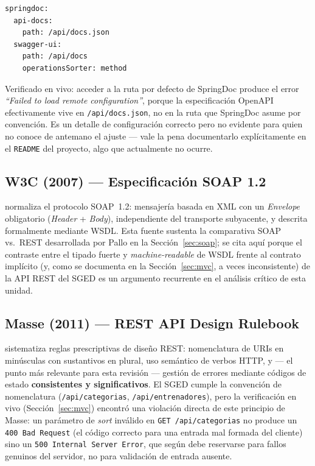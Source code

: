 \documentclass[12pt,a4paper]{article}
\begin{document}
\begin{lstlisting}[style=yaml, caption={Configuración SpringDoc en \texttt{application.yml}}]
springdoc:
  api-docs:
    path: /api/docs.json
  swagger-ui:
    path: /api/docs
    operationsSorter: method
\end{lstlisting}

Verificado en vivo: acceder a la ruta por defecto de SpringDoc produce el error
\textit{``Failed to load remote configuration''}, porque la especificación OpenAPI
efectivamente vive en \texttt{/api/docs.json}, no en la ruta que SpringDoc asume por
convención. Es un detalle de configuración correcto pero no evidente para quien no conoce
de antemano el ajuste --- vale la pena documentarlo explícitamente en el \texttt{README} del
proyecto, algo que actualmente no ocurre.

\subsection{W3C (2007) --- Especificación SOAP 1.2}

\textcite{w3c2007} normaliza el protocolo SOAP~1.2: mensajería basada en XML con un
\textit{Envelope} obligatorio (\textit{Header} + \textit{Body}), independiente del
transporte subyacente, y descrita formalmente mediante WSDL. Esta fuente sustenta la
comparativa SOAP vs.\ REST desarrollada por Pallo en la Sección~\ref{sec:soap}; se cita aquí
porque el contraste entre el tipado fuerte y \textit{machine-readable} de WSDL frente al
contrato implícito (y, como se documenta en la Sección~\ref{sec:mvc}, a veces inconsistente)
de la API REST del SGED es un argumento recurrente en el análisis crítico de esta unidad.

\subsection{Masse (2011) --- REST API Design Rulebook}

\textcite{masse2011} sistematiza reglas prescriptivas de diseño REST: nomenclatura de URIs
en minúsculas con sustantivos en plural, uso semántico de verbos HTTP, y --- el punto más
relevante para esta revisión --- gestión de errores mediante códigos de estado
\textbf{consistentes y significativos}. El SGED cumple la convención de nomenclatura
(\texttt{/api/categorias}, \texttt{/api/entrenadores}), pero la verificación en vivo
(Sección~\ref{sec:mvc}) encontró una violación directa de este principio de Masse: un
parámetro de \textit{sort} inválido en \texttt{GET /api/categorias} no produce un
\texttt{400 Bad Request} (el código correcto para una entrada mal formada del cliente) sino
un \texttt{500 Internal Server Error}, que según \textcite{masse2011} debe reservarse para
fallos genuinos del servidor, no para validación de entrada ausente.
\end{document}
